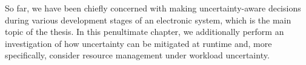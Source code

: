 So far, we have been chiefly concerned with making uncertainty-aware decisions
during various development stages of an electronic system, which is the main
topic of the thesis. In this penultimate chapter, we additionally perform an
investigation of how uncertainty can be mitigated at runtime and, more
specifically, consider resource management under workload uncertainty.

\section{\introductiontitle}

\section{\problemtitle}

\section{\pasttitle}

\section{\solutiontitle}

\section{\resultstitle}

\section{\conclusiontitle}
